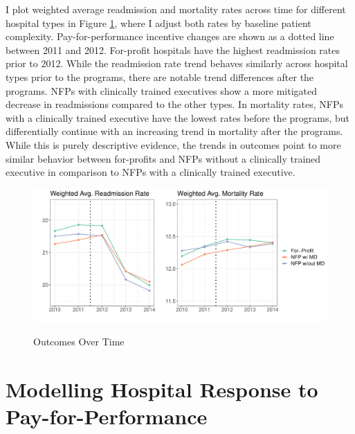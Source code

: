 \documentclass[12pt]{article}
\begin{document}
    I plot weighted average readmission and mortality rates across time for different hospital types in Figure \ref{fig:weighted_read_mort_graph}, where I adjust both rates by baseline patient complexity. Pay-for-performance incentive changes are shown as a dotted line between 2011 and 2012. For-profit hospitals have the highest readmission rates prior to 2012. While the readmission rate trend behaves similarly across hospital types prior to the programs, there are notable trend differences after the programs. NFPs with clinically trained executives show a more mitigated decrease in readmissions compared to the other types. In mortality rates, NFPs with a clinically trained executive have the lowest rates before the programs, but differentially continue with an increasing trend in mortality after the programs. While this is purely descriptive evidence, the trends in outcomes point to more similar behavior between for-profits and NFPs without a clinically trained executive in comparison to NFPs with a clinically trained executive.

    \begin{figure}[ht!]
    \centering
        \caption{Outcomes Over Time}
        \includegraphics[width=\textwidth]{Objects/weighted_read_mort_adjusted_graph.pdf}
        \label{fig:weighted_read_mort_graph}
    \end{figure}


    \section{Modelling Hospital Response to Pay-for-Performance}\label{sec:model}
\end{document}
